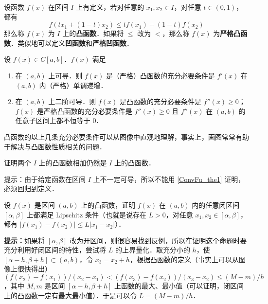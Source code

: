 

设函数 $f(x)$ 在区间 $I$ 上有定义，若对任意的 $x_1,x_2\in I$，对任意 $t\in (0,1)$，都有
\begin{equation}
f(tx_1+(1-t)x_2)\le tf(x_1)+(1-t)f(x_2)
\end{equation}
那么称 $f(x)$ 为 $I$ 上的\textbf{凸函数}．如果将 $\le$ 改为 $<$，那么称 $f(x)$ 为\textbf{严格凸函数}．类似地可以定义\textbf{凹函数}和\textbf{严格凹函数}．
\begin{theorem}{}\label{ConvFu_the1}
设 $f(x)\in C[a,b]$．$f(x)$ 满足
\begin{enumerate}
\item 在 $(a,b)$ 上可导．则 $f(x)$ 是（严格）凸函数的充分必要条件是 $f'(x)$ 在 $(a,b)$ 内（严格）单调递增．
\item 在 $(a,b)$ 上二阶可导．则 $f(x)$ 是凸函数的充分必要条件是 $f''(x)\ge 0$；$f(x)$ 是严格凸函数的充分必要条件是 $f''(x)\ge 0$ 且 $f''(x)$ 在 $(a,b)$ 的任意子区间上都不恒等于 $0$．
\end{enumerate}
\end{theorem}
凸函数的以上几条充分必要条件可以从图像中直观地理解，事实上，画图常常有助于解决与凸函数性质相关的问题．
\begin{exercise}{}
证明两个 $I$ 上的凸函数相加仍然是 $I$ 上的凸函数．
\end{exercise}
提示：由于给定函数在区间 $I$ 上不一定可导，所以不能用  
\autoref{ConvFu_the1} 证明，必须回归到定义．
\begin{exercise}{}
设 $f(x)$ 是区间 $(a,b)$ 上的凸函数，证明 $f(x)$ 在 $(a,b)$ 内的任意闭区间 $[\alpha,\beta]$ 上都满足 Lipschitz 条件（也就是说存在 $L>0$，对任意 $x_1,x_2\in [\alpha,\beta]$，都有 $|f(x_1)-f(x_2)|\le L|x_1-x_2|$）．

\textbf{提示：}如果将 $[\alpha,\beta]$ 改为开区间，则很容易找到反例，所以在证明这个命题时要充分利用好闭区间的特性，尝试将 $L$ 的上界量化．取充分小的 $h$，使 $[\alpha-h,\beta+h]\subset (a,b)$，令 $x_3=x_2+h$，根据凸函数的定义（事实上可以从图像上很快得出）$(f(x_2)-f(x_1))/(x_2-x_1)<(f(x_3)-f(x_2))/(x_3-x_2)\le (M-m)/h$，其中 $M,m$ 是区间 $[\alpha-h,\beta+h]$ 上函数的最大、最小值（可以证明，闭区间上的凸函数一定有最大最小值）．于是可以令 $L=(M-m)/h$．
\end{exercise}
